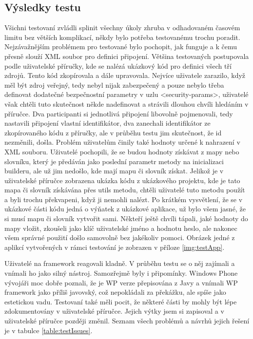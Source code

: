 \subsection{Výsledky testu}
Všichni testovaní zvládli splinit všechny úkoly zhruba v odhadovaném časovém limitu bez větších komplikací, někdy bylo potřeba testovanému trochu poradit. Nejzávažnějším problémem pro testované bylo pochopit, jak funguje a k čemu přesně slouží XML soubor pro definici připojení. Většina testovaných postupovala podle uživatelské příručky, kde se nalézá ukázkový kód pro definici všech tří zdrojů. Tento kód zkopírovala a dále upravovala. Nejvíce uživatele zarazilo, když měl být zdroj veřejný, tedy nebyl nijak zabezpečený a pouze nebylo třeba definovat dodatečné bezpečnostní parametry v uzlu <security-params>, uživatelé však chtěli tuto skutečnost někde nadefinovat a strávili dlouhou chvíli hledáním v příručce. Dva participanti si jednotlivá připojení libovolně pojmenovali, tedy nastavili připojení vlastní identifikátor, dva zanechali identifikátor ze zkopírovaného kódu z příručky, ale v průběhu testu jim skutečnost, že id nezměnili, došla. Problém uživatelům činily také hodnoty určené k nahrazení v XML souboru. Uživatelé pochopili, že se budou hodnoty získávat z mapy nebo slovníku, který je předáván jako poslední parametr metody na inicializaci builderu, ale už jim nedošlo, kde mají mapu či slovník získat. Jelikož je v uživatelské příručce zobrazena ukázka kódu z ukázkového projektu, kde je tato mapa či slovník získávána přes utils metodu, chtěli uživatelé tuto metodu použít a byli trochu překvapeni, když ji nemohli nalézt. Po krátkém vysvětlení, že se v ukázkové části kódu jedná o výňatek z ukázkové aplikace, už bylo všem jasné, že si musí mapu či slovník vytvořit sami. Někteří ještě chvíli tápali, jaké hodnoty do mapy vložit, zkoušeli jako klíč uživatelské jméno a hodnotu heslo, ale nakonec všem správné použití došlo samovolně bez jakékoliv pomoci. Obrázek jedné z aplikcí vytvořených v rámci testování je zobrazen v příloze \ref{img:testApp}.

Uživatelé na framework reagovali kladně. V průběhu testu se o něj zajímali a vnímali ho jako silný nástroj. Samozřejmě byly i připomínky. Windows Phone vývojáři moc dobře poznali, že je WP verze přepisována z Javy a vnímali WP framework jako příliš javovský, což nepokládali za překážku, ale spíše jako estetickou vadu. Testovaní také měli pocit, že některé části by mohly být lépe zdokumentovány v uživatelské příručce. Jejich výtky jsem si zapisoval a v uživatelské příručce později změnil. Seznam všech problémů a návrhů jejich řešení je v tabulce \ref{table:testIssues}.

